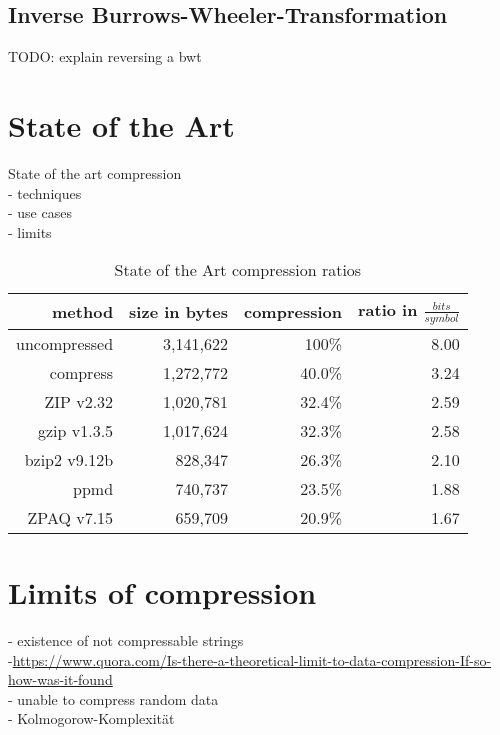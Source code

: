 \subsection{Inverse Burrows-Wheeler-Transformation}
\label{ch:Principles of compression:sec:Other:subSec:bwtInverse}

\par{
TODO: explain reversing a bwt
}

\section{State of the Art}
\label{ch:Principles of compression:sec:SOTA}
State of the art compression\\
- techniques\\
- use cases\\
- limits\\

\par{
	
	\begin{table}
		\begin{tabular}[p]{r|r|r|r}
			method &  size in bytes & compression & ratio in $\frac{bits}{symbol}$\\
			\hline
			uncompressed & 3,141,622 & 100\% & 8.00\\
			compress & 1,272,772 & 40.0\% & 3.24\\
			ZIP v2.32 & 1,020,781 & 32.4\% & 2.59\\
			gzip v1.3.5 & 1,017,624 & 32.3\% & 2.58\\
			bzip2 v9.12b & 828,347 & 26.3\% & 2.10 \\
			ppmd & 740,737 & 23.5\% & 1.88\\
			ZPAQ v7.15& 659,709 & 20.9\% & 1.67 
		\end{tabular}
				\label{tab:t20 stat of the art}
			\caption{State of the Art compression ratios}
	\end{table}

}

\section{Limits of compression}
\label{ch:Principles of compression:sec:Limits of Conpression}

- existence of not compressable strings\\
-\url{https://www.quora.com/Is-there-a-theoretical-limit-to-data-compression-If-so-how-was-it-found} \\
- unable to compress random data\\
- Kolmogorow-Komplexität	

